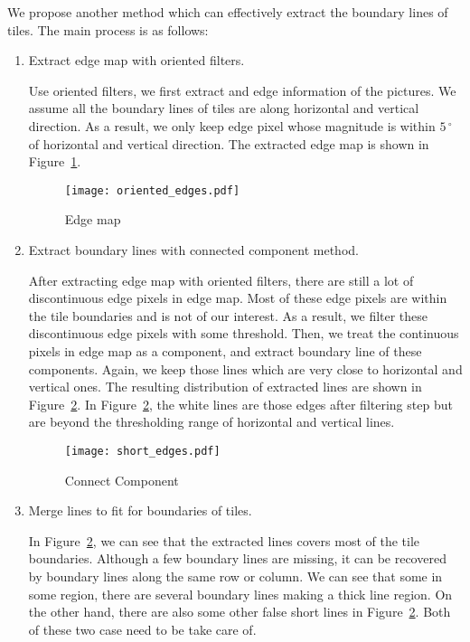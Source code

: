 We propose another method which can effectively extract the boundary lines of
 tiles. The main process is as follows:
\begin{enumerate}
	\item Extract edge map with oriented filters.
	
			Use oriented filters, we first extract and edge information of the 
			pictures. We assume all the boundary lines of tiles are along horizontal 
			and vertical direction. As a result, we only keep edge pixel whose 
			magnitude is within $5\,^{\circ}$ of horizontal and vertical direction. 
			The extracted edge map is shown in Figure~\ref{Edge_map}.
			
			\begin{figure}[htbp]
				  \centering
				  \texttt{[image: oriented\_edges.pdf]}
				  \caption{Edge map}
				  \label{Edge_map}
			\end{figure}
			
	\item Extract boundary lines with connected component method.
	
			After extracting edge map with oriented filters, there are still a lot of 
			discontinuous edge pixels in edge map. Most of these edge pixels are within 
			the tile boundaries and is not of our interest. As a result, we filter these 
			discontinuous edge pixels with some threshold. Then, we treat the continuous 
			pixels in edge map as a component, and extract boundary line of these components.
			Again, we keep those lines which are very close to horizontal and vertical ones.
			The resulting distribution of extracted lines are shown in Figure~\ref{Connect}.
			In Figure~\ref{Connect}, the white lines are those edges after filtering step but 
			are beyond the thresholding range of horizontal and vertical lines.
			
			 \begin{figure}[htbp]
				  \centering
				  \texttt{[image: short\_edges.pdf]}
				  \caption{Connect Component}
				  \label{Connect}
			\end{figure}
			
	\item  Merge lines to fit for boundaries of tiles.
			
			In Figure~\ref{Connect}, we can see that the extracted lines covers most of the tile 
			boundaries. Although a few boundary lines are missing, it can be recovered by boundary 
			lines along the same row or column. We can see that some in some region, there are several 
			boundary lines making a thick line region. On the other hand, there are also some other false 
			short lines in Figure~\ref{Connect}. Both of these two case need to be take care of. 
			

\end{enumerate}
